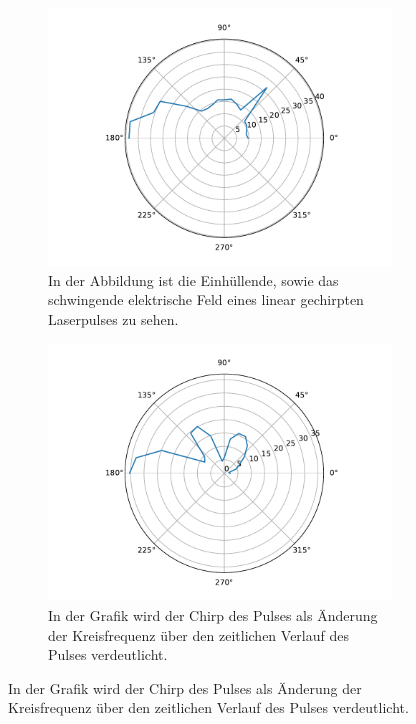 \begin{figure}[ht]
                \centering
                \begin{subfigure}[b]{0.45\textwidth}
                    \centering
                    \includegraphics[scale=0.3]{./pictures/H_atom_resonanz_3_4999Hz.pdf}
                    \caption{In der Abbildung ist die Einhüllende, sowie das schwingende elektrische Feld eines linear gechirpten Laserpulses zu sehen.}
                    \label{fig:H_atom_resonanz_3_4999Hz}
                \end{subfigure}
                \hfill
                \centering
                \begin{subfigure}[b]{0.45\textwidth}
                    \centering
                    \includegraphics[scale=0.3]{./pictures/H_atom_resonanz_4_7470Hz.pdf}
                    \caption{In der Grafik wird der Chirp des Pulses als Änderung der Kreisfrequenz über den zeitlichen Verlauf des Pulses verdeutlicht.}
                    \label{fig:H_atom_resonanz_4_7470Hz}
                \end{subfigure}
            \end{figure}

